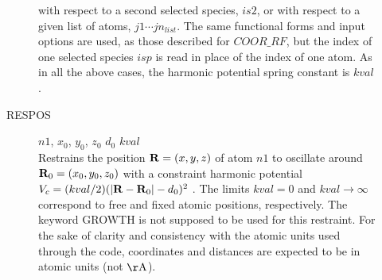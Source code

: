 \documentclass[twoside,10pt,titlepage,a4paper]{article}
\begin{document}
\begin{description}
\begin{description}
              with respect to a second selected species, $is2$, or with respect to a given
              list of atoms, $j1 \cdots jn_{list}$.
              The same functional forms and input options are used, as those
              described for $COOR\_RF$, but the index of one selected species $isp$
              is read in place of the index of one atom.
              As in all the above cases, the harmonic potential spring constant is $kval$.
             \item[RESPOS] $n1$, $x_0$, $y_0$, $z_0$ $d_0$ $kval$ \hfill\\
               Restrains the position ${\bf R}=(x,y,z)$ of atom $n1$ to oscillate
               around ${\bf R}_0=(x_0,y_0,z_0)$ with a constraint harmonic
               potential $V_c=(kval/2)(|{\bf R}-{\bf R}_0|-d_0)^2$ \cite{cco}.
               The limits $kval=0$ and $kval \to \infty$ correspond
               to free and fixed atomic positions, respectively.
               The keyword GROWTH is not supposed to be used for this restraint.
               For the sake of clarity and consistency with the atomic
               units used through the code, coordinates and distances are 
               expected to be in atomic units (not $\rm \AA$).
             \end{description}


\end{description}
\end{document}
